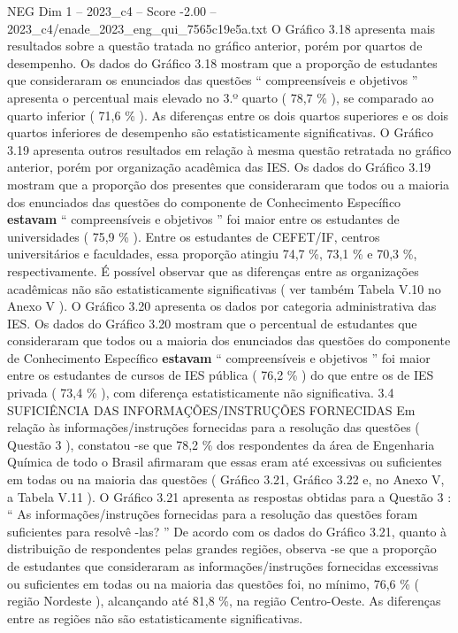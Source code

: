 \begin{textsample}{NEG Dim 1 – 2023\_c4 – Score -2.00 – 2023\_c4/enade\_2023\_eng\_qui\_7565c19e5a.txt}
O Gráfico 3.18 apresenta mais resultados sobre a questão tratada no gráfico anterior, porém por quartos de desempenho.
Os dados do Gráfico 3.18 mostram que a proporção de estudantes que consideraram os enunciados das questões “ compreensíveis e objetivos ” apresenta o percentual mais elevado no 3.º quarto ( 78,7 \% ), se comparado ao quarto inferior ( 71,6 \% ).
As diferenças entre os dois quartos superiores e os dois quartos inferiores de desempenho são estatisticamente significativas.
O Gráfico 3.19 apresenta outros resultados em relação à mesma questão retratada no gráfico anterior, porém por organização acadêmica das IES.
Os dados do Gráfico 3.19 mostram que a proporção dos presentes que consideraram que todos ou a maioria dos enunciados das questões do componente de Conhecimento Específico \textbf{estavam} “ compreensíveis e objetivos ” foi maior entre os estudantes de universidades ( 75,9 \% ).
Entre os estudantes de CEFET/IF, centros universitários e faculdades, essa proporção atingiu 74,7 \%, 73,1 \% e 70,3 \%, respectivamente.
É possível observar que as diferenças entre as organizações acadêmicas não são estatisticamente significativas ( ver também Tabela V.10 no Anexo V ).
O Gráfico 3.20 apresenta os dados por categoria administrativa das IES.
Os dados do Gráfico 3.20 mostram que o percentual de estudantes que consideraram que todos ou a maioria dos enunciados das questões do componente de Conhecimento Específico \textbf{estavam} “ compreensíveis e objetivos ” foi maior entre os estudantes de cursos de IES pública ( 76,2 \% ) do que entre os de IES privada ( 73,4 \% ), com diferença estatisticamente não significativa. 3.4 SUFICIÊNCIA DAS INFORMAÇÕES/INSTRUÇÕES FORNECIDAS Em relação às informações/instruções fornecidas para a resolução das questões ( Questão 3 ), constatou -se que 78,2 \% dos respondentes da área de Engenharia Química de todo o Brasil afirmaram que essas eram até excessivas ou suficientes em todas ou na maioria das questões ( Gráfico 3.21, Gráfico 3.22 e, no Anexo V, a Tabela V.11 ).
O Gráfico 3.21 apresenta as respostas obtidas para a Questão 3 : “ As informações/instruções fornecidas para a resolução das questões foram suficientes para resolvê -las? ” De acordo com os dados do Gráfico 3.21, quanto à distribuição de respondentes pelas grandes regiões, observa -se que a proporção de estudantes que consideraram as informações/instruções fornecidas excessivas ou suficientes em todas ou na maioria das questões foi, no mínimo, 76,6 \% ( região Nordeste ), alcançando até 81,8 \%, na região Centro-Oeste.
As diferenças entre as regiões não são estatisticamente significativas.

\end{textsample}

